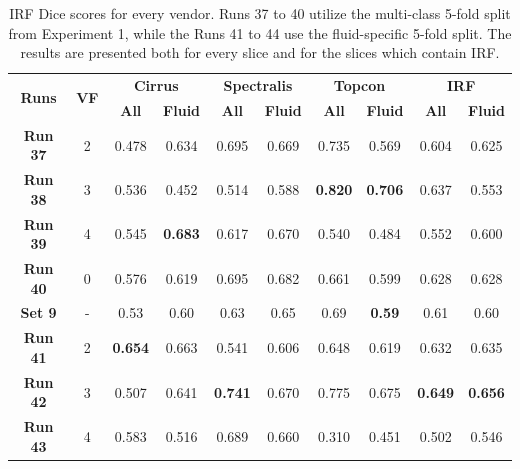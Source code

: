 \begin{table}[!ht]
	\caption{IRF Dice scores for every vendor. Runs 37 to 40 utilize the multi-class 5-fold split from Experiment 1, while the Runs 41 to 44 use the fluid-specific 5-fold split. The results are presented both for every slice and for the slices which contain IRF.}
	\centering
	\begin{tabular}{|c|c|cc|cc|cc|cc|}
			\hline
			\multirow{2}{*}{\textbf{Runs}} &
			\multirow{2}{*}{\textbf{VF}} & 
			\multicolumn{2}{c|}{\textbf{Cirrus}} & 
			\multicolumn{2}{c|}{\textbf{Spectralis}} & 
			\multicolumn{2}{c|}{\textbf{Topcon}} & 
			\multicolumn{2}{c|}{\textbf{IRF}} \\ 
			\cline{3-10} & &
			\multicolumn{1}{c}{\textbf{All}} &  
			\textbf{\textbf{Fluid}} & 
			\multicolumn{1}{c}{\textbf{All}} &  
			\textbf{\textbf{Fluid}} & 
			\multicolumn{1}{c}{\textbf{All}} & 
			\textbf{\textbf{Fluid}} & 
			\multicolumn{1}{c}{\textbf{All}} & 
			\textbf{\textbf{Fluid}}\\ 
			
			\hline
			
			\textbf{Run 37} & 2 & 0.478 & 0.634 & 0.695 & 0.669 & 0.735 & 0.569 & 0.604 & 0.625 \\
			
			\textbf{Run 38} & 3 & 0.536 & 0.452 & 0.514 & 0.588 & \textbf{0.820} & \textbf{0.706} & 0.637 & 0.553 \\
			
			\textbf{Run 39} & 4 & 0.545 & \textbf{0.683} & 0.617 & 0.670 & 0.540 & 0.484 & 0.552 & 0.600 \\
			
			\textbf{Run 40} & 0 & 0.576 & 0.619 & 0.695 & 0.682 & 0.661 & 0.599 & 0.628 & 0.628 \\
			
			\hline
			
			\textbf{Set 9} & - & 0.53 & 0.60 & 0.63 & 0.65 & 0.69 & \textbf{0.59} & 0.61 & 0.60 \\
			
			\hline
			\hline
			
			\textbf{Run 41} & 2 & \textbf{0.654} & 0.663 & 0.541 & 0.606 & 0.648 & 0.619 & 0.632 & 0.635 \\
			
			\textbf{Run 42} & 3 & 0.507 & 0.641 & \textbf{0.741} & 0.670 & 0.775 & 0.675 & \textbf{0.649} & \textbf{0.656} \\
			
			\textbf{Run 43} & 4 & 0.583 & 0.516 & 0.689 & 0.660 & 0.310 & 0.451 & 0.502 & 0.546 \\
			

\end{tabular}
\end{table}
